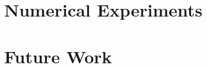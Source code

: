 \documentclass{beamer}
\renewcommand{\(}{\left(}
\renewcommand{\)}{\right)}
\begin{document}
\begin{frame}
\end{frame}


\section{Numerical Experiments}%
\begin{frame}
\end{frame}
\begin{frame}
\end{frame}
\begin{frame}
\end{frame}
\begin{frame}
\end{frame}


\section{Future Work}%
\begin{frame}
\end{frame}
\end{document}

